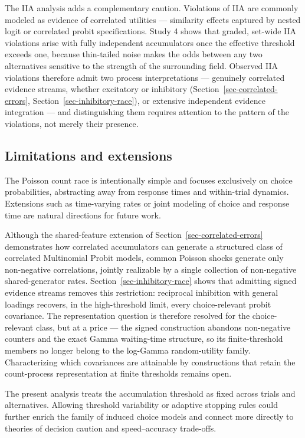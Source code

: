 \documentclass[
  man,
  floatsintext,
  longtable,
  a4paper,
  nolmodern,
  notxfonts,
  notimes,
  colorlinks=true,linkcolor=blue,citecolor=blue,urlcolor=blue]{apa7}
\begin{document}
The IIA analysis adds a complementary caution. Violations of IIA are
commonly modeled as evidence of correlated utilities --- similarity
effects captured by nested logit or correlated probit specifications.
Study 4 shows that graded, set-wide IIA violations arise with fully
independent accumulators once the effective threshold exceeds one,
because thin-tailed noise makes the odds between any two alternatives
sensitive to the strength of the surrounding field. Observed IIA
violations therefore admit two process interpretations --- genuinely
correlated evidence streams, whether excitatory or inhibitory
(Section~\ref{sec-correlated-errors},
Section~\ref{sec-inhibitory-race}), or extensive independent evidence
integration --- and distinguishing them requires attention to the
pattern of the violations, not merely their presence.

\subsection{Limitations and
extensions}\label{limitations-and-extensions}

The Poisson count race is intentionally simple and focuses exclusively
on choice probabilities, abstracting away from response times and
within-trial dynamics. Extensions such as time-varying rates or joint
modeling of choice and response time are natural directions for future
work.

Although the shared-feature extension of
Section~\ref{sec-correlated-errors} demonstrates how correlated
accumulators can generate a structured class of correlated Multinomial
Probit models, common Poisson shocks generate only non-negative
correlations, jointly realizable by a single collection of non-negative
shared-generator rates. Section~\ref{sec-inhibitory-race} shows that
admitting signed evidence streams removes this restriction: reciprocal
inhibition with general loadings recovers, in the high-threshold limit,
every choice-relevant probit covariance. The representation question is
therefore resolved for the choice-relevant class, but at a price --- the
signed construction abandons non-negative counters and the exact Gamma
waiting-time structure, so its finite-threshold members no longer belong
to the log-Gamma random-utility family. Characterizing which covariances
are attainable by constructions that retain the count-process
representation at finite thresholds remains open.

The present analysis treats the accumulation threshold as fixed across
trials and alternatives. Allowing threshold variability or adaptive
stopping rules could further enrich the family of induced choice models
and connect more directly to theories of decision caution and
speed--accuracy trade-offs.
\end{document}
